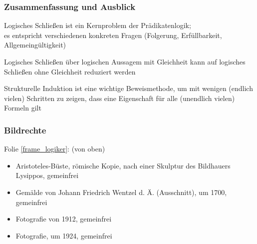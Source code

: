 \documentclass[aspectratio=1610,onlymath]{beamer}
\begin{document}
\begin{frame}\frametitle{Zusammenfassung und Ausblick}

Logisches Schließen ist ein Kernproblem der Prädikatenlogik;\\
es entspricht verschiedenen konkreten Fragen (Folgerung, Erfüllbarkeit, Allgemeingültigkeit)
\bigskip

Logisches Schließen über logischen Aussagem mit Gleichheit kann
auf logisches Schließen ohne Gleichheit reduziert werden\bigskip

Strukturelle Induktion ist eine wichtige Beweismethode, um mit wenigen (endlich vielen) Schritten zu zeigen, dass eine Eigenschaft für alle (unendlich vielen) Formeln gilt\bigskip



\end{frame}




\begin{frame}[t]\frametitle{Bildrechte}

Folie \ref{frame_logiker}: (von oben)
\begin{itemize}
\item Aristoteles-Büste, römische Kopie, nach einer Skulptur des Bildhauers Lysippos, gemeinfrei
\item Gemälde von Johann Friedrich Wentzel d. Ä. (Ausschnitt), um 1700, gemeinfrei
\item Fotografie von 1912, gemeinfrei
\item Fotografie, um 1924, gemeinfrei
\end{itemize}

\end{frame}
\end{document}
